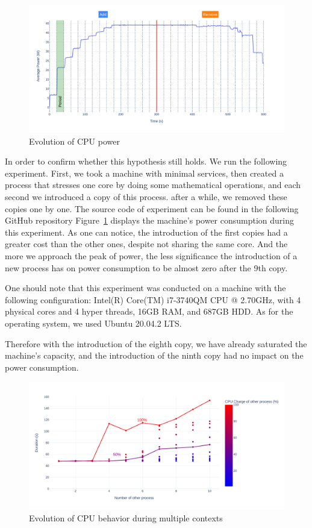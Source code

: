 \begin{figure}[!h]
      \centering
      \caption{Evolution of CPU power}
      \label{fig:power_evolution_greenfaas}
      \includegraphics[width=\linewidth]{chapters/power_evolution_greenfaas}
\end{figure}

In order to confirm whether this hypothesis still holds. We run the following experiment\link.
First, we took a machine with minimal services, then created a process that stresses one core by doing some mathematical operations, and each second we introduced a copy of this process. after a while, we removed these copies one by one.
The source code of experiment can be found in the following GitHub repository
Figure~\ref{fig:power_evolution_greenfaas} displays the machine's power consumption during this experiment. As one can notice, the introduction of the first copies had a greater cost than the other ones, despite not sharing the same core. And the more we approach the peak of power, the less significance the introduction of a new process has on power consumption to be almost zero after the 9th copy.

One should note that this experiment was conducted on a machine with the following configuration:
Intel(R) Core(TM) i7-3740QM CPU @ 2.70GHz, with 4 physical cores and 4 hyper threads, 16GB RAM, and 687GB HDD. As for the operating system, we used Ubuntu 20.04.2 LTS. 

Therefore with the introduction of the eighth copy, we have already saturated the machine's capacity, and the introduction of the ninth copy had no impact on the power consumption.
\begin{figure}[!h]
      \centering
      \includegraphics[width=\linewidth]{chapters/green_faas_duration}
      \caption{Evolution of CPU behavior during multiple contexts }
      \label{fig:green_faas_duration}
\end{figure}

